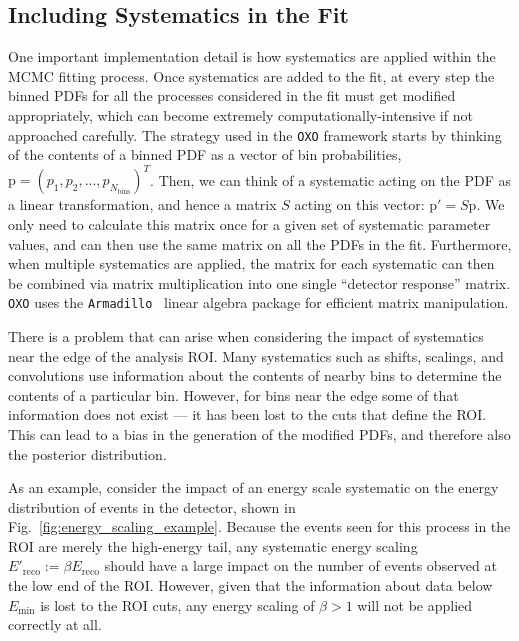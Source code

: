 \subsection{Including Systematics in the Fit}\label{sec:sys_in_fit_theory}
One important implementation detail is how systematics are applied within the MCMC fitting process. Once systematics are added to the fit, at every step the binned PDFs for all the processes considered in the fit must get modified appropriately, which can become extremely computationally-intensive if not approached carefully. The strategy used in the \texttt{OXO} framework starts by thinking of the contents of a binned PDF as a vector of bin probabilities, $\bm{\mathrm{p}} = \left(p_{1}, p_{2}, ..., p_{N_{\textrm{bins}}}\right)^{T}$. Then, we can think of a systematic acting on the PDF as a linear transformation, and hence a matrix $S$ acting on this vector: $\bm{\mathrm{p}'} = S\bm{\mathrm{p}}$. We only need to calculate this matrix once for a given set of systematic parameter values, and can then use the same matrix on all the PDFs in the fit. Furthermore, when multiple systematics are applied, the matrix for each systematic can then be combined via matrix multiplication into one single ``detector response'' matrix. \texttt{OXO} uses the \texttt{Armadillo}~\cite{} %
linear algebra package for efficient matrix manipulation.

There is a problem that can arise when considering the impact of systematics near the edge of the analysis ROI. Many systematics such as shifts, scalings, and convolutions use information about the contents of nearby bins to determine the contents of a particular bin. However, for bins near the edge some of that information does not exist --- it has been lost to the cuts that define the ROI. This can lead to a bias in the generation of the modified PDFs, and therefore also the posterior distribution.

As an example, consider the impact of an energy scale systematic on the energy distribution of  events in the detector, shown in Fig.~\ref{fig:energy_scaling_example}. Because the events seen for this process in the ROI are merely the high-energy tail, any systematic energy scaling $E'_{\textrm{reco}} := \beta E_{\textrm{reco}}$ should have a large impact on the number of events observed at the low end of the ROI. However, given that the information about data below $E_{\textrm{min}}$ is lost to the ROI cuts, any energy scaling of $\beta>1$ will not be applied correctly at all.


